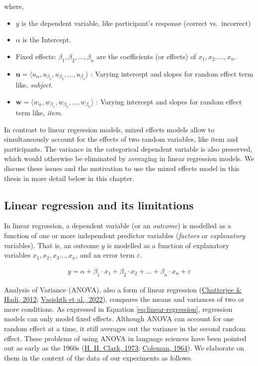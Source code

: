 \documentclass[a4paper, nobind]{templates/ociamthesis}
\providecommand{\tightlist}{%
  \setlength{\itemsep}{0pt}\setlength{\parskip}{0pt}}
\begin{document}
where,

\begin{itemize}
\tightlist
\item
  \(y\) is the dependent variable, like participant's response (correct vs.~incorrect)
\item
  \(\alpha\) is the Intercept.
\item
  Fixed effects: \(\beta_{1}, \beta_{2}, ..., \beta_{n}\) are the coefficients (or effects) of \(x_1, x_2, ...,x_n\).
\item
  \(\boldsymbol{u} = \langle u_{\alpha}, u_{\beta_1}, u_{\beta_2}, ..., u_{\beta_n} \rangle\) : Varying intercept and slopes for random effect term like, \emph{subject}.
\item
  \(\boldsymbol{w} = \langle w_{\alpha}, w_{\beta_1}, w_{\beta_2}, ..., w_{\beta_n} \rangle\) : Varying intercept and slopes for random effect term like, \emph{item}.
\end{itemize}

In contrast to linear regression models, mixed effects models allow to simultaneously account for the effects of two random variables, like item and participants.
The variance in the categorical dependent variable is also preserved, which would otherwise be eliminated by averaging in linear regression models.
We discuss these issues and the motivation to use the mixed effects model in this thesis in more detail below in this chapter.

\hypertarget{linear-regression-and-its-limitations}{%
\subsection{Linear regression and its limitations}\label{linear-regression-and-its-limitations}}

In linear regression, a dependent variable (or an \emph{outcome}) is modelled as a function of one or more independent predictor variables (\emph{factors} or \emph{explanatory} variables).
That is, an outcome \(y\) is modelled as a function of explanatory variables \(x_1, x_2, x_3..., x_n\), and an error term \(\varepsilon\).

\begin{align} \label{eq:linear-regression}
y =
\alpha + 
\beta_{1}\cdot{x_1} + 
\beta_{2}\cdot{x_2} + ... +
\beta_{n}\cdot{x_n} + \varepsilon 
\end{align}

Analysis of Variance (ANOVA), also a form of linear regression (\protect\hyperlink{ref-Chatterjee2012}{Chatterjee \& Hadi, 2012}; \protect\hyperlink{ref-Vasishth2022}{Vasishth et al., 2022}), compares the means and variances of two or more conditions.
As expressed in Equation \eqref{eq:linear-regression}, regression models can only model fixed effects.
Although ANOVA can account for one random effect at a time, it still averages out the variance in the second random effect.
These problems of using ANOVA in language sciences have been pointed out as early as the 1960s (\protect\hyperlink{ref-Clark1973}{H. H. Clark, 1973}; \protect\hyperlink{ref-Coleman1964}{Coleman, 1964}).
We elaborate on them in the context of the data of our experiments as follows.
\end{document}
